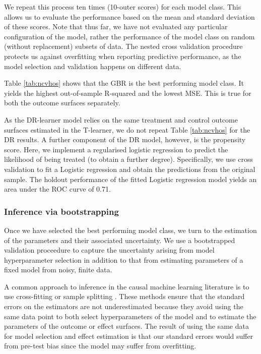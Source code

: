 \documentclass[12pt, a4paper]{article}
\begin{document}
We repeat this process ten times (10-outer scores) for each model class. This
allows us to evaluate the performance based on the mean and standard deviation
of these scores. Note that thus far, we have not evaluated any particular
configuration of the model, rather the performance of the model class on random
(without replacement) subsets of data. The nested cross validation procedure
protects us against overfitting when reporting predictive performance, as the
model selection and validation happens on different data.

Table \ref{tab:ncvhos} shows that the GBR is the best performing model class.
It yields the highest out-of-sample R-squared and the lowest MSE. This is true
for both the outcome surfaces separately.

As the DR-learner model relies on the same treatment and control outcome surfaces estimated in the T-learner, we do not repeat Table \ref{tab:ncvhos} for the DR results. A further component of the DR model, however, is the propensity score. Here, we implement a regularised logistic regression to predict the likelihood of being treated (to obtain a further degree). Specifically, we use cross validation to fit a Logistic regression and obtain the predictions from the original sample. The holdout performance of the fitted Logistic regression model yields an area under the ROC curve of 0.71.

\subsubsection*{Inference via bootstrapping}

Once we have selected the best performing model class, we turn to the
estimation of the parameters and their associated uncertainty. We use a
bootstrapped validation proceedure to capture the uncertainty arising from
model hyperparameter selection in addition to that from estimating parameters
of a fixed model from noisy, finite data. 


A common approach to inference in the causal machine learning literature is to
use cross-fitting \citep{cherno2018} or sample splitting \citep{athey2019}.
These methods ensure that the standard errors on the estimators are not
underestimated because they avoid using the same data point to both select
hyperparameters of the model and to estimate the parameters of the outcome or
effect surfaces. 
The result of using the same data for model selection and effect estimation is
that our standard errors would suffer from pre-test bias since the model may
suffer from overfitting.
\end{document}
